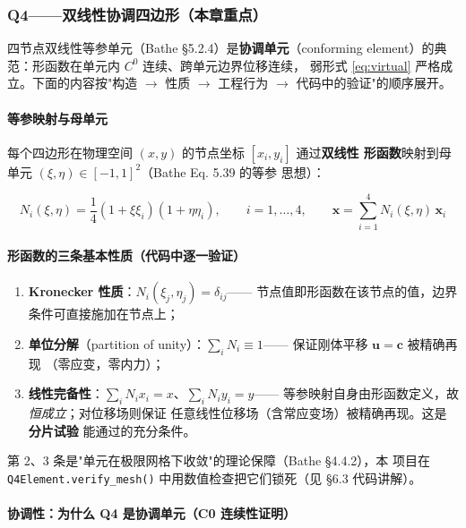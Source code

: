 \documentclass[12pt,a4paper]{ctexart}
\newcommand{\fem}{\Verb}
\begin{document}
\subsubsection{Q4——双线性协调四边形（本章重点）}

四节点双线性等参单元（Bathe §5.2.4）是\textbf{协调单元}（conforming
element）的典范：形函数在单元内 $C^0$ 连续、跨单元边界位移连续，
弱形式 \eqref{eq:virtual} 严格成立。下面的内容按"构造 $\to$ 性质
$\to$ 工程行为 $\to$ 代码中的验证"的顺序展开。

\paragraph{等参映射与母单元}

每个四边形在物理空间 $(x,y)$ 的节点坐标 $[x_i, y_i]$ 通过\textbf{双线性
形函数}映射到母单元 $(\xi,\eta)\in[-1,1]^2$（Bathe Eq. 5.39 的等参
思想）：

\begin{equation}
N_i(\xi,\eta) = \frac{1}{4}(1+\xi\xi_i)(1+\eta\eta_i), \qquad i=1,\dots,4,
\qquad
\mathbf{x} = \sum_{i=1}^{4} N_i(\xi,\eta)\,\mathbf{x}_i
\label{eq:q4-shape}
\end{equation}

\paragraph{形函数的三条基本性质（代码中逐一验证）}

\begin{enumerate}[leftmargin=*]
  \item \textbf{Kronecker 性质}：$N_i(\xi_j,\eta_j) = \delta_{ij}$——
        节点值即形函数在该节点的值，边界条件可直接施加在节点上；
  \item \textbf{单位分解}（partition of unity）：$\sum_i N_i \equiv 1$——
        保证刚体平移 $\mathbf{u} = \mathbf{c}$ 被精确再现
        （零应变，零内力）；
  \item \textbf{线性完备性}：$\sum_i N_i x_i = x$、$\sum_i N_i y_i = y$——
        等参映射自身由形函数定义，故\emph{恒成立}；对位移场则保证
        任意线性位移场（含常应变场）被精确再现。这是\textbf{分片试验}
        能通过的充分条件。
\end{enumerate}

第 2、3 条是"单元在极限网格下收敛"的理论保障（Bathe §4.4.2），本
项目在 \fem|Q4Element.verify_mesh()| 中用数值检查把它们锁死（见
§6.3 代码讲解）。

\paragraph{协调性：为什么 Q4 是协调单元（C0 连续性证明）}
\end{document}
